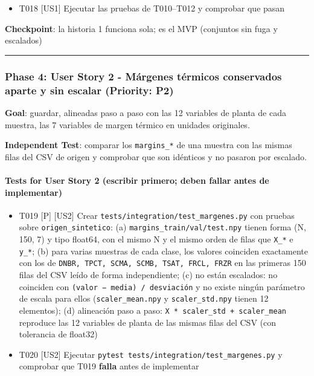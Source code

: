 \documentclass[12pt,a4paper]{article}
\providecommand{\tightlist}{\setlength{\itemsep}{0pt}\setlength{\parskip}{0pt}}
\newenvironment{documentogenerado}[2]{%
  \def\doccomando{#1}\def\docruta{#2}%
  \par\begingroup\small\setstretch{1.15}\sloppy%
}{\endgroup\par\medskip}
\begin{document}
\begin{documentogenerado}{/speckit-tasks (fase 7: /speckit-converge)}{specs\slash 001-preparacion-datos\slash tasks.md}
\begin{itemize}
\item[$\boxtimes$]
  T018 {[}US1{]} Ejecutar las pruebas de T010--T012 y comprobar que pasan
\end{itemize}

\textbf{Checkpoint}: la historia 1 funciona sola; es el MVP (conjuntos sin fuga y escalados)

\begin{center}\rule{0.5\linewidth}{0.5pt}\end{center}

\subsubsection{Phase 4: User Story 2 - Márgenes térmicos conservados aparte y sin escalar (Priority: P2)}

\textbf{Goal}: guardar, alineadas paso a paso con las 12 variables de planta de cada muestra, las 7 variables de margen térmico en unidades originales.

\textbf{Independent Test}: comparar los \texttt{margins\_\allowbreak{}*} de una muestra con las mismas filas del CSV de origen y comprobar que son idénticos y no pasaron por escalado.

\paragraph{Tests for User Story 2 (escribir primero; deben fallar antes de implementar)}

\begin{itemize}
\tightlist
\item[$\boxtimes$]
  T019 {[}P{]} {[}US2{]} Crear \texttt{tests/\allowbreak{}integration/\allowbreak{}test\_\allowbreak{}margenes.\allowbreak{}py} con pruebas sobre \texttt{origen\_\allowbreak{}sintetico}: (a) \texttt{margins\_\allowbreak{}train/\allowbreak{}val/\allowbreak{}test.\allowbreak{}npy} tienen forma (N, 150, 7) y tipo float64, con el mismo N y el mismo orden de filas que \texttt{X\_\allowbreak{}*} e \texttt{y\_\allowbreak{}*}; (b) para varias muestras de cada clase, los valores coinciden exactamente con los de \texttt{DNBR,\ TPCT,\ SCMA,\ SCMB,\ TSAT,\ FRCL,\ FRZR} en las primeras 150 filas del CSV leído de forma independiente; (c) no están escalados: no coinciden con \texttt{(valor\ −\ media)\ /\allowbreak{}\ desviación} y no existe ningún parámetro de escala para ellos (\texttt{scaler\_\allowbreak{}mean.\allowbreak{}npy} y \texttt{scaler\_\allowbreak{}std.\allowbreak{}npy} tienen 12 elementos); (d) alineación paso a paso: \texttt{X\ *\ scaler\_\allowbreak{}std\ +\ scaler\_\allowbreak{}mean} reproduce las 12 variables de planta de las mismas filas del CSV (con tolerancia de float32)
\item[$\boxtimes$]
  T020 {[}US2{]} Ejecutar \texttt{pytest\ tests/\allowbreak{}integration/\allowbreak{}test\_\allowbreak{}margenes.\allowbreak{}py} y comprobar que T019 \textbf{falla} antes de implementar
\end{itemize}


\end{documentogenerado}
\end{document}
